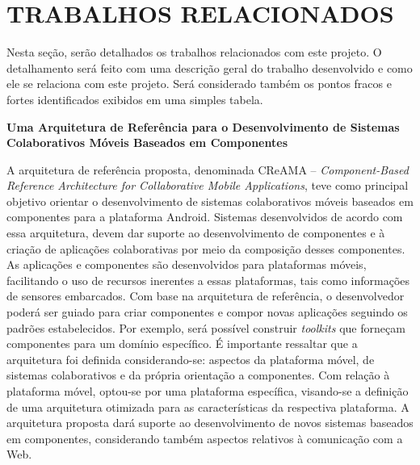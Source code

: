 
\section{TRABALHOS RELACIONADOS}
Nesta seção, serão detalhados os trabalhos relacionados com este projeto. O detalhamento será feito com uma descrição geral do trabalho desenvolvido e como ele se relaciona com este projeto. Será considerado também os pontos fracos e fortes identificados exibidos em uma simples tabela.\par\par

\textbf{Uma Arquitetura de Referência para o Desenvolvimento de Sistemas Colaborativos Móveis Baseados em Componentes}\par
A arquitetura de referência proposta, denominada CReAMA – \textit{Component-Based Reference Architecture for Collaborative Mobile Applications}, teve como principal objetivo orientar o desenvolvimento de sistemas colaborativos móveis baseados em componentes para a plataforma Android. Sistemas desenvolvidos de acordo com essa arquitetura, devem dar suporte ao desenvolvimento de componentes e à criação de aplicações colaborativas por meio da composição desses componentes. As aplicações e componentes são desenvolvidos para plataformas móveis, facilitando o uso de recursos inerentes a essas plataformas, tais como informações de sensores embarcados. Com base na arquitetura de referência, o desenvolvedor poderá ser guiado para criar componentes e compor novas aplicações seguindo os padrões estabelecidos. Por exemplo, será possível construir \textit{toolkits} que forneçam componentes para um domínio específico. É importante ressaltar que a arquitetura foi definida considerando-se: aspectos da plataforma móvel, de sistemas colaborativos e da própria orientação a componentes. Com relação à plataforma móvel, optou-se por uma plataforma específica, visando-se a definição de uma arquitetura otimizada para as características da respectiva plataforma. A arquitetura proposta dará suporte ao desenvolvimento de novos sistemas baseados em componentes, considerando também aspectos relativos à comunicação com a Web.\par

